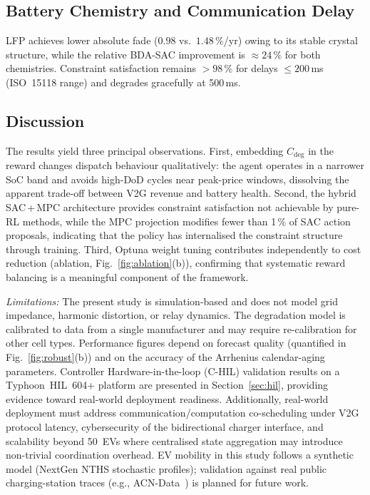 \documentclass[journal,10pt,twocolumn]{IEEEtran}
\begin{document}
\subsection{Battery Chemistry and Communication Delay}

LFP achieves lower absolute fade ($0.98$ vs.\ $1.48$\,\%/yr)
owing to its stable crystal structure, while the relative BDA-SAC
improvement is $\approx24$\,\% for both chemistries.
Constraint satisfaction remains $>98$\,\% for delays $\leq200$\,ms
(ISO~15118 range) and degrades gracefully at 500\,ms.


\subsection{Discussion}

The results yield three principal observations.
First, embedding $C_\mathrm{deg}$ in the reward changes dispatch
behaviour qualitatively: the agent operates in a narrower SoC band
and avoids high-DoD cycles near peak-price windows, dissolving the
apparent trade-off between V2G revenue and battery health.
Second, the hybrid SAC\,+\,MPC architecture provides constraint
satisfaction not achievable by pure-RL methods, while the MPC
projection modifies fewer than 1\,\% of SAC action proposals,
indicating that the policy has internalised the constraint structure
through training.
Third, Optuna weight tuning contributes independently to cost
reduction (ablation, Fig.~\ref{fig:ablation}(b)), confirming that
systematic reward balancing is a meaningful component of the framework.

\textit{Limitations:}
The present study is simulation-based and does not model grid
impedance, harmonic distortion, or relay dynamics.
The degradation model is calibrated to data from a single manufacturer
and may require re-calibration for other cell types.
Performance figures depend on forecast quality (quantified in
Fig.~\ref{fig:robust}(b)) and on the accuracy of the Arrhenius
calendar-aging parameters.
Controller Hardware-in-the-loop (C-HIL) validation results on a
Typhoon~HIL~604+ platform are presented in Section~\ref{sec:hil},
providing evidence toward real-world deployment readiness.
Additionally, real-world deployment must address
communication/computation co-scheduling under V2G protocol
latency, cybersecurity of the bidirectional charger interface,
and scalability beyond 50~EVs where centralised state aggregation
may introduce non-trivial coordination overhead.
EV mobility in this study follows a synthetic model (NextGen NTHS
stochastic profiles); validation against real public charging-station
traces (e.g., ACN-Data~\cite{lee_acndata_2019}) is planned for
future work.
\end{document}
